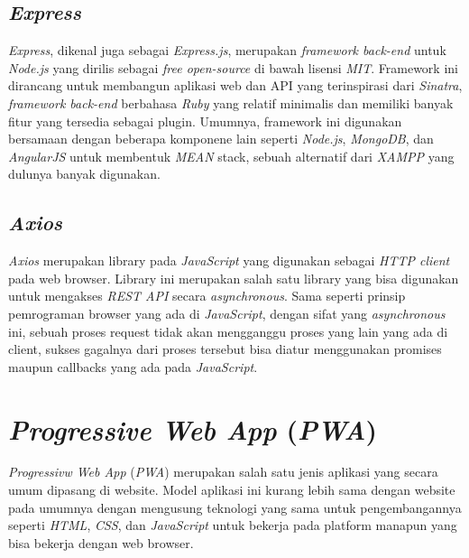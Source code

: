 \subsection{\emph{Express}}
\vspace{1ex}

\emph{Express}, dikenal juga sebagai \emph{Express.js}, merupakan \emph{framework back-end} untuk \emph{Node.js} yang dirilis sebagai \emph{free open-source} di bawah lisensi \emph{MIT}.
Framework ini dirancang untuk membangun aplikasi web dan API yang terinspirasi dari \emph{Sinatra}, \emph{framework back-end} berbahasa \emph{Ruby} yang relatif minimalis dan memiliki banyak fitur yang tersedia sebagai plugin.
Umumnya, framework ini digunakan bersamaan dengan beberapa komponene lain seperti \emph{Node.js}, \emph{MongoDB}, dan \emph{AngularJS} untuk membentuk \emph{MEAN} stack, sebuah alternatif dari \emph{XAMPP} yang dulunya banyak digunakan.
\vspace{0.5ex}

\subsection{\emph{Axios}}
\vspace{1ex}

\emph{Axios} merupakan library pada \emph{JavaScript} yang digunakan sebagai \emph{HTTP client} pada web browser.
Library ini merupakan salah satu library yang bisa digunakan untuk mengakses \emph{REST API} secara \emph{asynchronous}.
Sama seperti prinsip pemrograman browser yang ada di \emph{JavaScript}, dengan sifat yang \emph{asynchronous} ini, sebuah proses request tidak akan mengganggu proses yang lain yang ada di client, sukses gagalnya dari proses tersebut bisa diatur menggunakan promises maupun callbacks yang ada pada \emph{JavaScript}.
\vspace{0.5ex}

\section{\emph{Progressive Web App} (\emph{PWA})}
\vspace{1ex}

\emph{Progressivw Web App} (\emph{PWA}) merupakan salah satu jenis aplikasi yang secara umum dipasang di website.
Model aplikasi ini kurang lebih sama dengan website pada umumnya dengan mengusung teknologi yang sama untuk pengembangannya seperti \emph{HTML}, \emph{CSS}, dan \emph{JavaScript} untuk bekerja pada platform manapun yang bisa bekerja dengan web browser.
\vspace{0.5ex}

